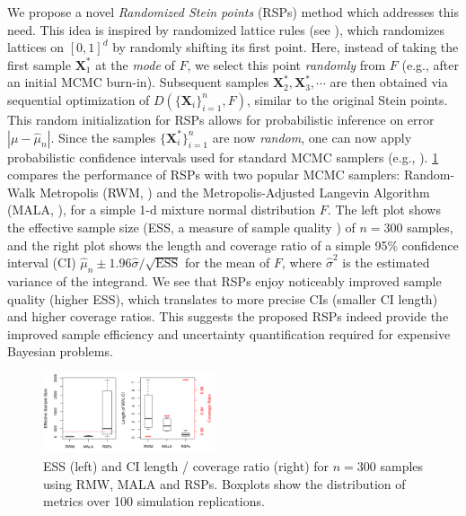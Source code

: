 \documentclass[11pt]{NSFamsart}
\newcommand{\bX}{{\boldsymbol{X}}}
\begin{document}
We propose a novel \textit{Randomized Stein points} (RSPs) method which addresses this need. This idea is inspired by randomized lattice rules (see \cite{l2002recent}), which randomizes lattices on $[0,1]^d$ by randomly shifting its first point. Here, instead of taking the first sample $\bX_1^*$ at the \textit{mode} of $F$, we select this point  \textit{randomly} from $F$ (e.g., after an initial MCMC burn-in). Subsequent samples $\bX_2^*, \bX_3^*, \cdots$ are then obtained via sequential optimization of $D(\{\bX_i\}_{i=1}^n, F)$, similar to the original Stein points. This random initialization for RSPs allows for probabilistic inference on error $|\mu - \hat{\mu}_n|$. Since the samples $\{\bX_i^*\}_{i=1}^n$ are now \textit{random}, one can now apply probabilistic confidence intervals used for standard MCMC samplers (e.g., \cite{atchade2016markov,rosenthal2017simple}). \cref{fig:rsp} compares the performance of RSPs with two popular MCMC samplers: Random-Walk Metropolis (RWM, \cite{metropolis1953equation}) and the Metropolis-Adjusted Langevin Algorithm (MALA, \cite{roberts1996exponential}), for a simple 1-d mixture normal distribution $F$. The left plot shows the effective sample size (ESS, a measure of sample quality \cite{GelEtal13}) of $n=300$ samples, and the right plot shows the length and coverage ratio of a simple 95\% confidence interval (CI) $\hat{\mu}_n \pm 1.96 \hat{\sigma} / \sqrt{\text{ESS}}$ for the mean of $F$, where $\hat{\sigma}^2$ is the estimated variance of the integrand. We see that RSPs enjoy noticeably improved sample quality (higher ESS), which translates to more precise CIs (smaller CI length) and higher coverage ratios. This suggests the proposed RSPs indeed provide the improved sample efficiency and uncertainty quantification required for expensive Bayesian problems.

\begin{figure}
	\centering
	\includegraphics[width = 0.45\textwidth] {ProgramsImages/rsp.png}
	\caption{ESS (left) and CI length / coverage ratio (right) for $n=300$ samples using RMW, MALA and RSPs. Boxplots show the distribution of metrics over 100 simulation replications. \label{fig:rsp}}
	\vspace{-0.6cm}
\end{figure}
\end{document}
